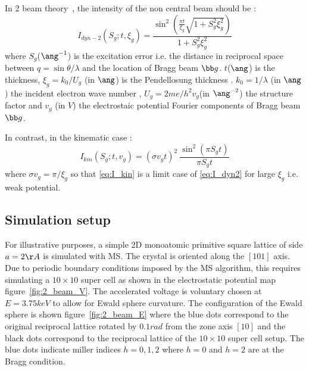 \documentclass[a4paper,10pt]{article}
\begin{document}
In 2 beam theory~\cite{ZuoSpence2016}, the intensity of the non central beam should be :
\begin{equation}\label{eq:I_dyn2}
  I_{dyn-2}(S_g;t,\xi_g) =
    \frac{\sin^2\left(\frac{\pi t}{\xi_g}
    \sqrt{1+S_g^2\xi_g^2}\right)}{1+S_g^2\xi_g^2}
\end{equation}
where $S_g$($\ang^{-1}$) is the excitation error i.e. the distance in reciprocal space between $q=\sin\theta/\lambda$ and the location of Bragg beam $\bb g$.
$t$($\ang$) is the thickness,
$\xi_g=k_0/U_g$ (in $\ang$) is the Pendellosung thickness .
$k_0=1/\lambda$ (in $\ang$) the incident electron wave number ,
$U_g=2me/h^2 v_g$(in $\ang^{-2}$) the structure factor and $v_g$ (in $V$) the electrostaic potential Fourier components of Bragg beam $\bb g$.

In contrast, in the kinematic case :
\begin{equation}\label{eq:I_kin}
  I_{kin}(S_g;t,v_g) = \left(\sigma v_g t\right)^2\
  \frac{\sin^2\left(\pi S_gt\right)}{\pi S_g t}
\end{equation}
where $\sigma v_g=\pi/\xi_g$ so that \eqref{eq:I_kin} is a limit case of \eqref{eq:I_dyn2} for large $\xi_g$ i.e. weak potential.





\subsection{Simulation setup}

For illustrative purposes, a simple 2D monoatomic primitive square lattice of side $a=2\AA$ is simulated with MS.
The crystal is oriented along the $[10 1]$ axis. Due to periodic boundary conditions imposed by the MS algorithm, this requires simulating a $10\times10$ super cell as shown in the electrostatic potential map figure~\ref{fig:2_beam_V}.
The accelerated voltage is voluntary chosen at $E=3.75keV$ to allow for  Ewald sphere curvature. The configuration of the Ewald sphere is shown figure~\ref{fig:2_beam_E} where the blue dots correspond to the original reciprocal lattice rotated by $0.1rad$ from the zone axis $[1 0]$ and the black dots correspond to the reciprocal lattice of the $10\times10$ super cell setup. The blue dots indicate miller indices $h=0,1,2$ where $h=0$ and $h=2$ are at the Bragg condition.
\end{document}
